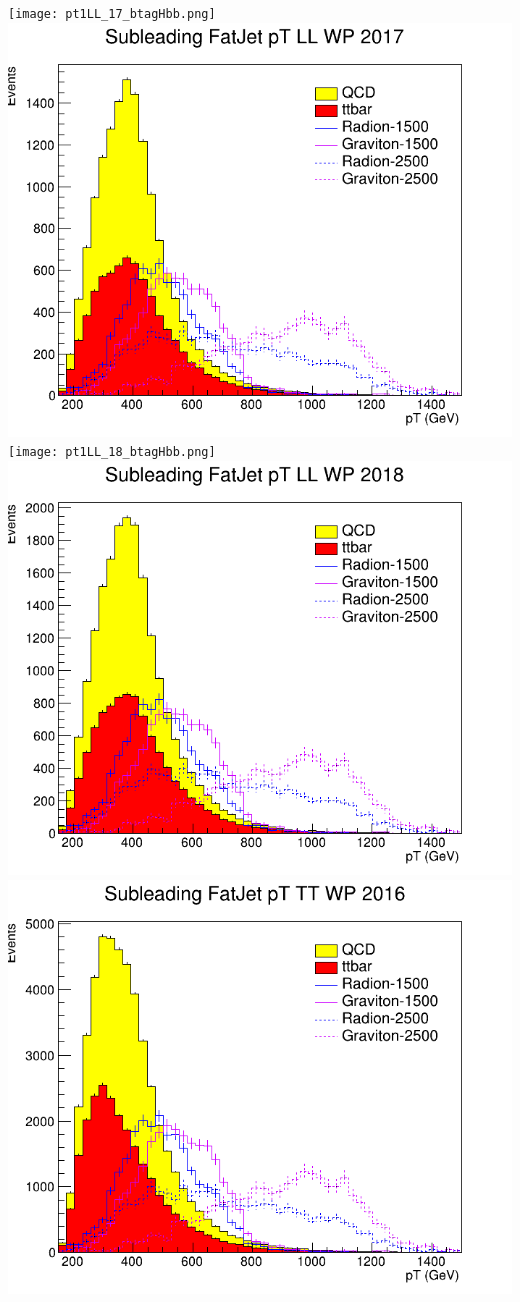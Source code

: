 \texttt{[image: pt1LL\_17\_btagHbb.png]}
\includegraphics[width=1\textwidth]{pt1LL_17_deepTagMD_HbbvsQCD.png}
\texttt{[image: pt1LL\_18\_btagHbb.png]}
\includegraphics[width=1\textwidth]{pt1LL_18_deepTagMD_HbbvsQCD.png}
\includegraphics[width=1\textwidth]{pt1TT_16_btagHbb.png}
